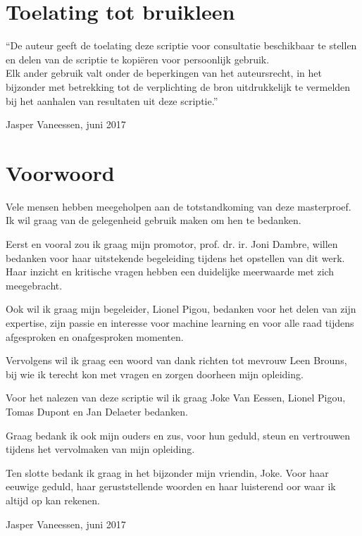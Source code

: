 
\chapter*{Toelating tot bruikleen}

\vspace{1.5cm}

\noindent
``De auteur geeft de toelating deze scriptie voor consultatie beschikbaar
te stellen en delen van de scriptie te kopi\"eren voor persoonlijk
gebruik.\\
Elk ander gebruik valt onder de beperkingen van het auteursrecht,
in het bijzonder met betrekking tot de verplichting de bron uitdrukkelijk
te vermelden bij het aanhalen van resultaten uit deze scriptie.''

\addvspace{4cm}

\noindent Jasper Vaneessen, juni 2017

\chapter{Voorwoord}

\begin{slshape}
\renewcommand{\baselinestretch}{1.2}
\small\normalsize

Vele mensen hebben meegeholpen aan de totstandkoming van deze masterproef. Ik wil graag van de gelegenheid gebruik maken om hen te bedanken.

\npar Eerst en vooral zou ik graag mijn promotor, prof. dr. ir. Joni Dambre, willen bedanken voor haar uitstekende begeleiding tijdens het opstellen van dit werk. Haar inzicht en kritische vragen hebben een duidelijke meerwaarde met zich meegebracht.

\npar Ook wil ik graag mijn begeleider, Lionel Pigou, bedanken voor het delen van zijn expertise, zijn passie en interesse voor machine learning en voor alle raad tijdens afgesproken en onafgesproken momenten. 

\npar Vervolgens wil ik graag een woord van dank richten tot mevrouw Leen Brouns, bij wie ik terecht kon met vragen en zorgen doorheen mijn opleiding.

\npar Voor het nalezen van deze scriptie wil ik graag Joke Van Eessen, Lionel Pigou, Tomas Dupont en Jan Delaeter bedanken.

\npar Graag bedank ik ook mijn ouders en zus, voor hun geduld, steun en vertrouwen tijdens het vervolmaken van mijn opleiding. 

\npar Ten slotte bedank ik graag in het bijzonder mijn vriendin, Joke. Voor haar eeuwige geduld, haar geruststellende woorden en haar luisterend oor waar ik altijd op kan rekenen.


\addvspace{4cm}

\noindent Jasper Vaneessen, juni 2017
\end{slshape}

